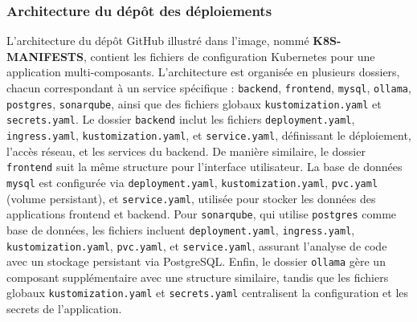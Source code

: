 \subsubsection{Architecture du dépôt des déploiements}
L'architecture du dépôt GitHub illustré dans l'image, nommé \textbf{K8S-MANIFESTS}, contient les fichiers de configuration Kubernetes pour une application multi-composants. L'architecture est organisée en plusieurs dossiers, chacun correspondant à un service spécifique : \texttt{backend}, \texttt{frontend}, \texttt{mysql}, \texttt{ollama}, \texttt{postgres}, \texttt{sonarqube}, ainsi que des fichiers globaux \texttt{kustomization.yaml} et \texttt{secrets.yaml}. Le dossier \texttt{backend} inclut les fichiers \texttt{deployment.yaml}, \texttt{ingress.yaml}, \texttt{kustomization.yaml}, et \texttt{service.yaml}, définissant le déploiement, l'accès réseau, et les services du backend. De manière similaire, le dossier \texttt{frontend} suit la même structure pour l'interface utilisateur. La base de données \texttt{mysql} est configurée via \texttt{deployment.yaml}, \texttt{kustomization.yaml}, \texttt{pvc.yaml} (volume persistant), et \texttt{service.yaml}, utilisée pour stocker les données des applications frontend et backend. Pour \texttt{sonarqube}, qui utilise \texttt{postgres} comme base de données, les fichiers incluent \texttt{deployment.yaml}, \texttt{ingress.yaml}, \texttt{kustomization.yaml}, \texttt{pvc.yaml}, et \texttt{service.yaml}, assurant l'analyse de code avec un stockage persistant via PostgreSQL. Enfin, le dossier \texttt{ollama} gère un composant supplémentaire avec une structure similaire, tandis que les fichiers globaux \texttt{kustomization.yaml} et \texttt{secrets.yaml} centralisent la configuration et les secrets de l'application.

